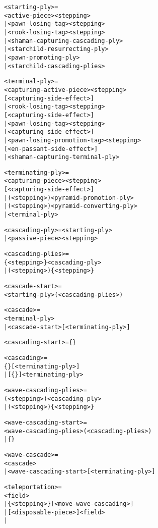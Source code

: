\begin{alltt}
<starting-ply> =
  <active-piece><stepping>
| <pawn-losing-tag><stepping>
| <rook-losing-tag><stepping>
| <shaman-capturing-cascading-ply>
| <starchild-resurrecting-ply>
| <pawn-promoting-ply>
| <starchild-cascading-plies>

<terminal-ply> =
  <capturing-active-piece><stepping>
    [<capturing-side-effect>]
| <rook-losing-tag><stepping>
    [<capturing-side-effect>]
| <pawn-losing-tag><stepping>
    [<capturing-side-effect>]
| <pawn-losing-promotion-tag><stepping>
    [<en-passant-side-effect>]
| <shaman-capturing-terminal-ply>

<terminating-ply> =
  <capturing-piece><stepping>
    [<capturing-side-effect>]
| (<stepping>\alg{~})<pyramid-promotion-ply>
| (<stepping>\alg{~})<pyramid-converting-ply>
| <terminal-ply>

<cascading-ply> = <starting-ply>
                | <passive-piece><stepping>

<cascading-plies> =
  \{<stepping>\}\alg{~}<cascading-ply>
| (<stepping>)\{<stepping>\}
\end{alltt}

\clearpage %

\begin{alltt}
<cascade-start> =
  <starting-ply>(<cascading-plies>)

<cascade> =
  <terminal-ply>
| <cascade-start>[\alg{~}<terminating-ply>]

<cascading-start> = \{<cascading-plies>\}

<cascading> =
  \{<cascading-plies>\}[\alg{~}<terminating-ply>]
| [\{<cascading-plies>\}\alg{~}]<terminating-ply>

<wave-cascading-plies> =
  (<stepping>)\alg{~}<cascading-ply>
| (<stepping>)\{<stepping>\}

<wave-cascading-start> =
  <wave-cascading-plies>(<cascading-plies>)
| \{<cascading-plies>\}

<wave-cascade> =
  \alg{~}<cascade>
| <wave-cascading-start>[\alg{~}<terminating-ply>]

<teleportation> =
  \alg{|}<field>
| \{<stepping>\}[<move-wave-cascading>]
| \alg{||}[<disposable-piece>]<field>
| \alg{||}
\end{alltt}

\clearpage %

